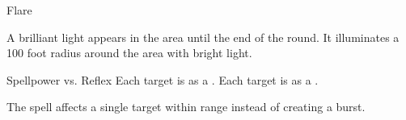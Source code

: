 \begin{spellsection}{Flare}
\begin{spellcontent}
\begin{spelltargetinginfo}
\end{spelltargetinginfo}
\begin{spelleffects}
\spelleffect
A brilliant light appears in the area until the end of the round.
It illuminates a 100 foot radius around the area with bright light.
\begin{spellattack}{Spellpower vs. Reflex}
\spellsuccess
Each target is \dazzled as a .
\spellcritical
Each target is \blinded as a .
\end{spellattack}
\end{spelleffects}
\end{spellcontent}
\begin{spellfooter}
\end{spellfooter}
\begin{spellsubcontent}
\begin{spellcantrip}
The spell affects a single target within range instead of creating a burst.
\end{spellcantrip}
\end{spellsubcontent}
\end{spellsection}
